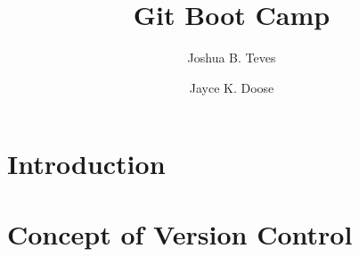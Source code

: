 \documentclass[12pt]{amsbook}
\title{Git Boot Camp}
\author{Joshua B. Teves}
\author{Jayce K. Doose}
\begin{document}
\maketitle

\tableofcontents

\chapter*{Introduction}


\chapter{Concept of Version Control}

\end{document}
